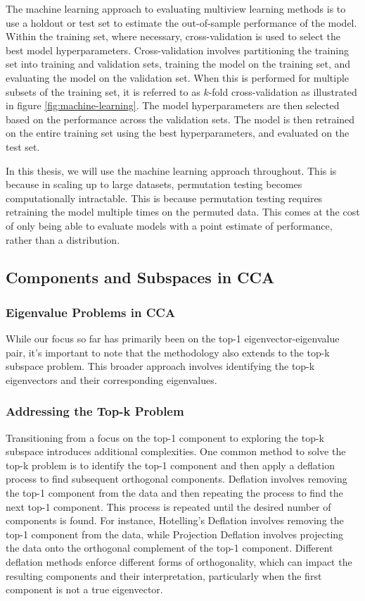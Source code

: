 The machine learning approach to evaluating multiview learning methods is to use a holdout or test set to estimate the out-of-sample performance of the model.
Within the training set, where necessary, cross-validation is used to select the best model hyperparameters.
Cross-validation involves partitioning the training set into training and validation sets, training the model on the training set, and evaluating the model on the validation set.
When this is performed for multiple subsets of the training set, it is referred to as \(k\)-fold cross-validation as illustrated in figure \ref{fig:machine-learning}.
The model hyperparameters are then selected based on the performance across the validation sets.
The model is then retrained on the entire training set using the best hyperparameters, and evaluated on the test set.

In this thesis, we will use the machine learning approach throughout.
This is because in scaling up to large datasets, permutation testing becomes computationally intractable.
This is because permutation testing requires retraining the model multiple times on the permuted data.
This comes at the cost of only being able to evaluate models with a point estimate of performance, rather than a distribution.

\subsection{Components and Subspaces in CCA}

\subsubsection{Eigenvalue Problems in CCA}

While our focus so far has primarily been on the top-1 eigenvector-eigenvalue pair, it's important to note that the methodology also extends to the top-k subspace problem.
This broader approach involves identifying the top-k eigenvectors and their corresponding eigenvalues.

\subsubsection{Addressing the Top-k Problem}

Transitioning from a focus on the top-1 component to exploring the top-k subspace introduces additional complexities. One common method to solve the top-k problem is to identify the top-1 component and then apply a deflation process to find subsequent orthogonal components.
Deflation involves removing the top-1 component from the data and then repeating the process to find the next top-1 component. This process is repeated until the desired number of components is found.
For instance, Hotelling's Deflation \citep{hotelling1933analysis} involves removing the top-1 component from the data, while Projection Deflation \citep{mackey2008deflation} involves projecting the data onto the orthogonal complement of the top-1 component.
Different deflation methods enforce different forms of orthogonality, which can impact the resulting components and their interpretation, particularly when the first component is not a true eigenvector.

